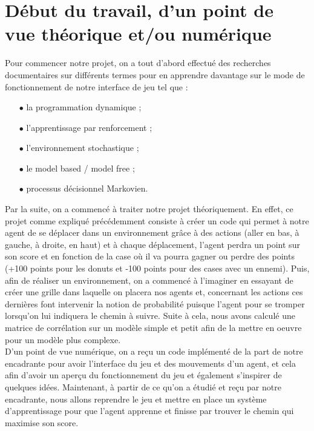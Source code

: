 \newpage
\section{Début du travail, d'un point de vue théorique et/ou numérique}

\vspace{0.6cm}

Pour commencer notre projet, on a tout d'abord effectué des recherches documentaires sur différents termes pour en apprendre davantage sur le mode de  fonctionnement de notre interface de jeu tel que : \
\begin{itemize}
    \item[$\bullet$] la programmation dynamique ;
    \item[$\bullet$] l'apprentissage par renforcement ;
    \item [$\bullet$]l'environnement stochastique ;
    \item[$\bullet$] le model based / model free ;
    \item[$\bullet$] processus décisionnel Markovien.


\end{itemize}
\vspace{0,5cm}

Par la suite, on a commencé à traiter notre projet théoriquement. En effet, ce projet comme expliqué précédemment consiste à créer un code qui permet à notre agent de se déplacer dans un environnement grâce à des actions (aller en bas, à gauche, à droite, en haut) et à chaque déplacement, l'agent perdra un point sur son score et en fonction de la case où il va pourra gagner ou perdre des points (+100 points pour les donuts et -100 points pour des cases avec un ennemi).
Puis, afin de réaliser un environnement, on a commencé à l'imaginer en essayant de créer une grille dans laquelle on placera nos agents et, concernant les actions ces dernières font intervenir la notion de probabilité puisque l'agent pour se tromper lorsqu'on lui indiquera le chemin à suivre. Suite à cela, nous avons calculé une matrice de corrélation sur un modèle simple et petit afin de la mettre en oeuvre pour un modèle plus complexe.  \\

D'un point de vue numérique, on a reçu un code implémenté de la part de notre encadrante pour avoir l'interface du jeu et des mouvements d'un agent, et cela afin d'avoir un aperçu du fonctionnement du jeu et également s'inspirer de quelques idées. Maintenant, à partir de ce qu'on a étudié et reçu par notre encadrante, nous allons reprendre le jeu et mettre en place un système d'apprentissage pour que l'agent apprenne et finisse par trouver le chemin qui maximise son score.

